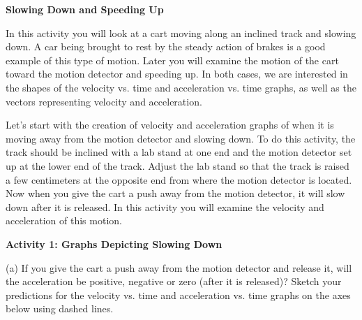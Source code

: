 \medskip
\textbf{Slowing Down and Speeding Up }

In this activity you will look at a cart moving along an inclined track and
slowing down. A car being brought to rest by the steady action of brakes is
a good example of this type of motion. Later you will examine the motion of
the cart toward the motion detector and speeding up. In both cases, we are interested
in the shapes of the velocity vs. time and acceleration vs. time graphs, as
well as the vectors representing velocity and acceleration. 

Let's start with the creation of velocity and acceleration graphs of when it
is moving away from the motion detector and slowing down. To do this activity,
the track should be inclined with a lab stand at one end and the motion detector set up at the lower end of the track. Adjust the lab stand so that the track is raised a few centimeters at the opposite end from where the motion detector is located. Now when you give the cart a push away from the motion detector, it will slow down after it is released. In this activity you will examine the velocity and acceleration of this motion.

\pagebreak[2]
\textbf{Activity 1: Graphs Depicting Slowing Down} 

(a) If you give the cart a push away from the motion detector and release it,
will the acceleration be positive, negative or zero (after it is released)?
Sketch your predictions for the velocity vs. time and acceleration vs. time
graphs on the axes below using dashed lines.

